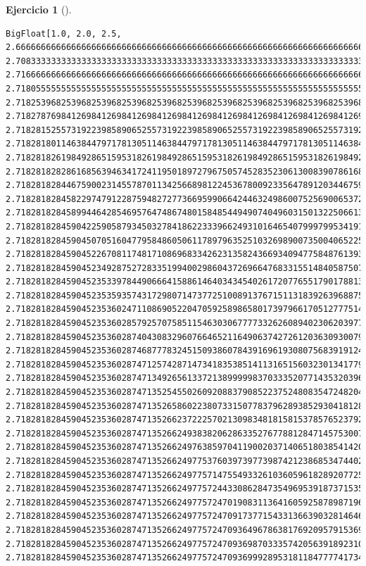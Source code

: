 \documentclass[
  a4paper,
]{scrreport}
\theoremstyle{definition}
\newtheorem{exercise}{Ejercicio}[chapter]
\theoremstyle{remark}
\begin{document}
\begin{exercise}[]
\begin{tcolorbox}
\begin{verbatim}
BigFloat[1.0, 2.0, 2.5, 2.666666666666666666666666666666666666666666666666666666666666666666666666666644, 2.708333333333333333333333333333333333333333333333333333333333333333333333333322, 2.716666666666666666666666666666666666666666666666666666666666666666666666666671, 2.718055555555555555555555555555555555555555555555555555555555555555555555555534, 2.718253968253968253968253968253968253968253968253968253968253968253968253968258, 2.718278769841269841269841269841269841269841269841269841269841269841269841269832, 2.718281525573192239858906525573192239858906525573192239858906525573192239858903, 2.718281801146384479717813051146384479717813051146384479717813051146384479717817, 2.718281826198492865159531826198492865159531826198492865159531826198492865159574, 2.718281828286168563946341724119501897279675057452835230613008390786168563946358, 2.718281828446759002314557870113425668981224536780092335647891203446759002314557, 2.718281828458229747912287594827277366959906642446324986007525690065372605055147, 2.718281828458994464285469576474867480158485449490740496031501322506613511904548, 2.718281828459042259058793450327841862233396624931016465407999799534191068582618, 2.718281828459045070516047795848605061178979635251032698900735004065225042504853, 2.718281828459045226708117481710869683342623135824366934094775848761393596611634, 2.718281828459045234928752728335199400298604372696647683315514840587507731038329, 2.718281828459045235339784490666415886146403434540261720776551790178813437759681, 2.718281828459045235359357431729807147377251008913767151131839263968875614270182, 2.718281828459045235360247110869052204705925898658017397966170512777514804111594, 2.718281828459045235360285792570758511546303067777332626089402306203977377582977, 2.718281828459045235360287404308329607664652116490637427261203630930079984810947, 2.718281828459045235360287468777832451509386078439169619308075683919124089100055, 2.718281828459045235360287471257428714734183538514113165156032301341779631572729, 2.718281828459045235360287471349265613372138999998370333520771435320396503516118, 2.718281828459045235360287471352545502609208837908522375248083547248204248942663, 2.718281828459045235360287471352658602238073315077837962893852930418128653957366, 2.718281828459045235360287471352662372225702130983481815815378576523792800791222, 2.71828182845904523536028747135266249383820628633527677881284714575300777326972, 2.718281828459045235360287471352662497638597041190020371406518038541420741159675, 2.71828182845904523536028747135266249775376039739773987421238685347440295230786, 2.718281828459045235360287471352662497757147554933261036059618289207725958518098, 2.718281828459045235360287471352662497757244330862847354969539187371535187266983, 2.718281828459045235360287471352662497757247019083113641605925878987196554732219, 2.718281828459045235360287471352662497757247091737715433136639032814646861961018, 2.718281828459045235360287471352662497757247093649678638176920957915369238467045, 2.718281828459045235360287471352662497757247093698703335742056391892310837864609, 2.718281828459045235360287471352662497757247093699928953181184777741734377849586, 
\end{verbatim}
\end{tcolorbox}
\end{exercise}
\end{document}
